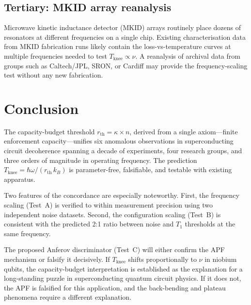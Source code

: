 \documentclass[11pt]{article}
\begin{document}
\subsection{Tertiary: MKID array reanalysis}

Microwave kinetic inductance detector (MKID) arrays routinely place dozens of resonators at different frequencies on a single chip.  Existing characterisation data from MKID fabrication runs likely contain the loss-vs-temperature curves at multiple frequencies needed to test $T_{\mathrm{knee}} \propto \nu$.  A reanalysis of archival data from groups such as Caltech/JPL, SRON, or Cardiff may provide the frequency-scaling test without any new fabrication.



\section{Conclusion}

The capacity-budget threshold $r_{\mathrm{th}} = \kappa \times n$, derived from a single axiom---finite enforcement capacity---unifies six anomalous observations in superconducting circuit decoherence spanning a decade of experiments, four research groups, and three orders of magnitude in operating frequency.  The prediction $T_{\mathrm{knee}} = \hbar\omega/(r_{\mathrm{th}} \, k_B)$ is parameter-free, falsifiable, and testable with existing apparatus.

Two features of the concordance are especially noteworthy.  First, the frequency scaling (Test~A) is verified to within measurement precision using two independent noise datasets.  Second, the configuration scaling (Test~B) is consistent with the predicted 2:1 ratio between noise and $T_1$ thresholds at the same frequency.

The proposed Anferov discriminator (Test~C) will either confirm the APF mechanism or falsify it decisively.  If $T_{\mathrm{knee}}$ shifts proportionally to $\nu$ in niobium qubits, the capacity-budget interpretation is established as the explanation for a long-standing puzzle in superconducting quantum circuit physics.  If it does not, the APF is falsified for this application, and the back-bending and plateau phenomena require a different explanation.

\end{document}
